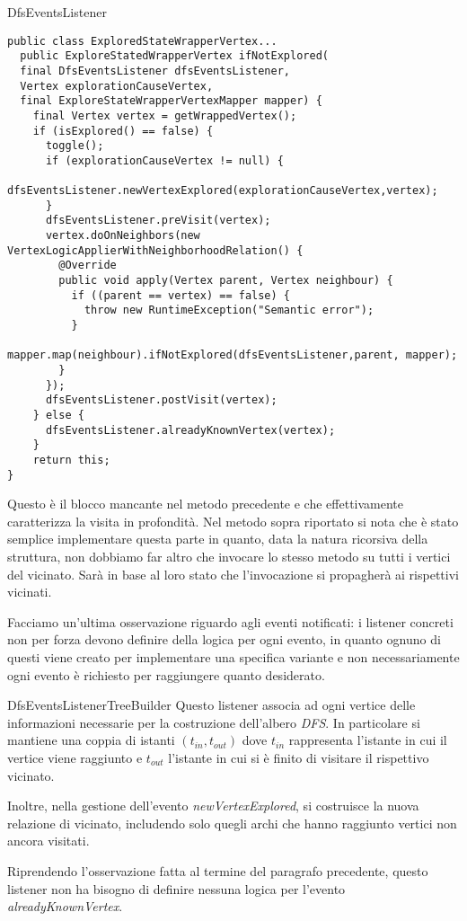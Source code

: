 \begin{paragraph}{DfsEventsListener}
\begin{lstlisting}
public class ExploredStateWrapperVertex...
  public ExploreStatedWrapperVertex ifNotExplored(
  final DfsEventsListener dfsEventsListener,
  Vertex explorationCauseVertex,
  final ExploreStateWrapperVertexMapper mapper) {
    final Vertex vertex = getWrappedVertex();
    if (isExplored() == false) {
      toggle();
      if (explorationCauseVertex != null) {
        dfsEventsListener.newVertexExplored(explorationCauseVertex,vertex);
      }
      dfsEventsListener.preVisit(vertex);
      vertex.doOnNeighbors(new VertexLogicApplierWithNeighborhoodRelation() {
        @Override
        public void apply(Vertex parent, Vertex neighbour) {
          if ((parent == vertex) == false) {
            throw new RuntimeException("Semantic error");
          }
          mapper.map(neighbour).ifNotExplored(dfsEventsListener,parent, mapper);
        }
      });
      dfsEventsListener.postVisit(vertex);
    } else {
      dfsEventsListener.alreadyKnownVertex(vertex);
    }
    return this;
}
\end{lstlisting}
Questo \`e il blocco mancante nel metodo precedente e che
effettivamente caratterizza la visita in profondit\`a. Nel metodo
sopra riportato si nota che \`e stato semplice implementare questa
parte in quanto, data la natura ricorsiva della struttura, non
dobbiamo far altro che invocare lo stesso metodo su tutti i vertici
del vicinato. Sar\`a in base al loro stato che l'invocazione si
propagher\`a ai rispettivi vicinati. 

Facciamo un'ultima osservazione riguardo agli eventi notificati: i
listener concreti non per forza devono definire della logica per ogni
evento, in quanto ognuno di questi viene creato per implementare una
specifica variante e non necessariamente ogni evento \`e richiesto per
raggiungere quanto desiderato.
\end{paragraph}

\begin{paragraph}{DfsEventsListenerTreeBuilder}
  Questo listener associa ad ogni vertice delle informazioni
  necessarie per la costruzione dell'albero \emph{DFS}. In particolare
  si mantiene una coppia di istanti $(t_{in}, t_{out})$ dove $t_{in}$
  rappresenta l'istante in cui il vertice viene raggiunto e $t_{out}$
  l'istante in cui si \`e finito di visitare il rispettivo vicinato.

  Inoltre, nella gestione dell'evento \emph{newVertexExplored}, si
  costruisce la nuova relazione di vicinato, includendo solo quegli
  archi che hanno raggiunto vertici non ancora visitati.

  Riprendendo l'osservazione fatta al termine del paragrafo
  precedente, questo listener non ha bisogno di definire nessuna
  logica per l'evento \emph{alreadyKnownVertex}.
\end{paragraph}

